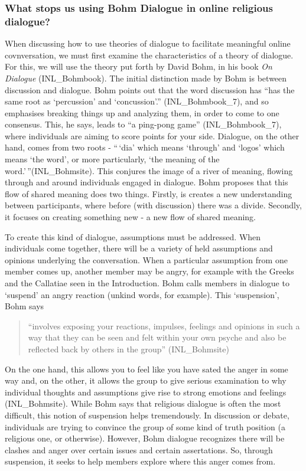 \documentclass[]{article}
\begin{document}
\hypertarget{what-stops-us-using-bohm-dialogue-in-online-religious-dialogue}{%
\subsubsection{What stops us using Bohm Dialogue in online religious
dialogue?}\label{what-stops-us-using-bohm-dialogue-in-online-religious-dialogue}}

When discussing how to use theories of dialogue to facilitate meaningful
online covnversation, we must first examine the characteristics of a
theory of dialogue. For this, we will use the theory put forth by David
Bohm, in his book \emph{On Dialogue} (INL\_Bohmbook). The initial
distinction made by Bohm is between discussion and dialogue. Bohm points
out that the word discussion has ``has the same root as `percussion' and
`concussion'.'' (INL\_Bohmbook\_7), and so emphasises breaking things up
and analyzing them, in order to come to one consensus. This, he says,
leads to ``a ping-pong game'' (INL\_Bohmbook\_7), where individuals are
aiming to score points for your side. Dialogue, on the other hand, comes
from two roots - ``\,`dia' which means `through' and `logos' which means
`the word', or more particularly, `the meaning of the
word.'\,''(INL\_Bohmsite). This conjures the image of a river of
meaning, flowing through and around individuals engaged in dialogue.
Bohm proposes that this flow of shared meaning does two things. Firstly,
is creates a new understanding between participants, where before (with
discussion) there was a divide. Secondly, it focuses on creating
something new - a new flow of shared meaning.

To create this kind of dialogue, assumptions must be addressed. When
individuals come together, there will be a variety of held assumptions
and opinions underlying the conversation. When a particular assumption
from one member comes up, another member may be angry, for example with
the Greeks and the Callatiae seen in the Introduction. Bohm calls
members in dialogue to `suspend' an angry reaction (unkind words, for
example). This `suspension', Bohm says

\begin{quote}
``involves exposing your reactions, impulses, feelings and opinions in
such a way that they can be seen and felt within your own psyche and
also be reflected back by others in the group'' (INL\_Bohmsite)
\end{quote}

On the one hand, this allows you to feel like you have sated the anger
in some way and, on the other, it allows the group to give serious
examination to why individual thoughts and assumptions give rise to
strong emotions and feelings (INL\_Bohmsite). While Bohm says that
religious dialogue is often the most difficult, this notion of
suspension helps tremendously. In discussion or debate, individuals are
trying to convince the group of some kind of truth position (a religious
one, or otherwise). However, Bohm dialogue recognizes there will be
clashes and anger over certain issues and certain assertations. So,
through suspension, it seeks to help members explore where this anger
comes from.
\end{document}
